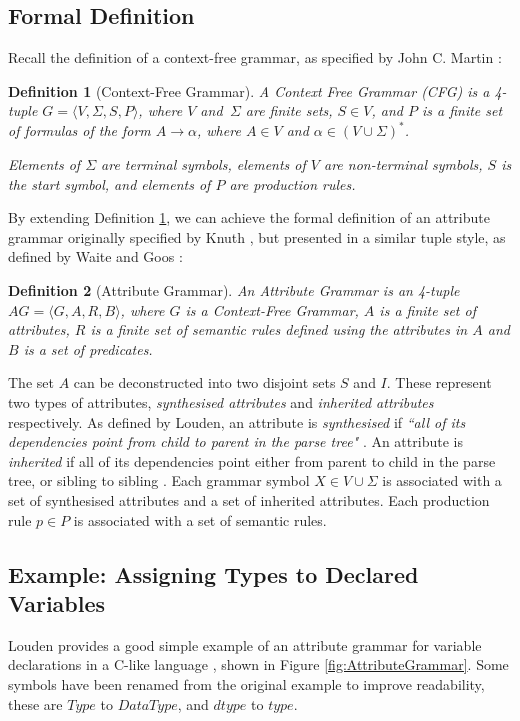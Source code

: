 \documentclass{UoYCSproject}
\newtheorem{definition}{Definition}[section]
\begin{document}
\subsection{Formal Definition}
\label{sec:FormalDefinition}
Recall the definition of a context-free grammar, as specified by John C. Martin
\cite{Martin}:
\begin{definition}[Context-Free Grammar] \label{def:CFG}
    A Context Free Grammar (CFG) is a 4-tuple $G = \langle V, \Sigma, S, 
    P\rangle$, where $V$ and $\,\Sigma$ are finite sets, $S \in V$, and $P$ is a
    finite set of formulas of the form $A \rightarrow \alpha$, where $A \in V$
    and $\alpha \in (V \cup \Sigma)^\ast$.

    Elements of $\Sigma$ are terminal symbols, elements of $V$ are non-terminal
    symbols, $S$ is the start symbol, and elements of $P$ are production rules.
\end{definition}
By extending Definition \ref{def:CFG}, we can achieve the formal definition of 
an attribute grammar originally specified by Knuth \cite{KnuthGrammars}, but 
presented in a similar tuple style, as defined by Waite and Goos 
\cite{WaiteBook}:
\begin{definition}[Attribute Grammar] \label{def:AG}
    An Attribute Grammar is an 4-tuple $AG = \langle G, A, R, B\rangle$, where
    $G$ is a Context-Free Grammar, $A$ is a finite set of attributes, $R$ 
    is a finite set of semantic rules defined using the attributes in $A$ and
    $B$ is a set of predicates.
\end{definition}
The set $A$ can be deconstructed into two disjoint sets $S$ and $I$. These
represent two types of attributes, \textit{synthesised attributes} and 
\textit{inherited attributes} respectively. As defined by Louden, an attribute
is \textit{synthesised} if \textit{``all of its dependencies point from child 
    to parent in the parse tree"} \cite[\S6.2.2, p.~277]{Louden}. An attribute
is \textit{inherited} if all of its dependencies point either from 
parent to child in the parse tree, or sibling to sibling 
\cite[\S6.2.2, p.~278]{Louden}. Each grammar symbol $X \in V \cup \Sigma$ is 
associated with a set of synthesised attributes and a set of inherited 
attributes. Each production rule $p \in P$ is associated with a set of 
semantic rules.

\subsection{Example: Assigning Types to Declared Variables}
Louden provides a good simple example of an attribute grammar for variable
declarations in a C-like language \cite{Louden}, shown in Figure 
\ref{fig:AttributeGrammar}. Some symbols have been renamed from the original
example to improve readability, these are $Type$ to $DataType$, and $dtype$ to
$type$.
\end{document}
